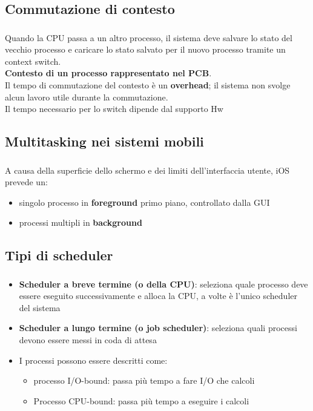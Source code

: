 \documentclass{beamer}
\newenvironment{mainframe}{
	\begin{frame}
		\frametitle{\insertsubsection}
		\framesubtitle{\insertsection}
	}{
	\end{frame}
}
\begin{document}
\subsection{Commutazione di contesto}
\begin{mainframe}
	Quando la CPU passa a un altro processo, il sistema deve salvare lo stato del vecchio processo e caricare lo stato salvato per il nuovo processo tramite un context switch.\\
	\textbf{Contesto di un processo rappresentato nel PCB}.\\
	Il tempo di commutazione del contesto è un \textbf{overhead}; il sistema non svolge alcun lavoro utile durante la commutazione.\\
	Il tempo necessario per lo switch dipende dal supporto Hw
\end{mainframe}
\subsection{Multitasking nei sistemi mobili}
\begin{mainframe}
	A causa della superficie dello schermo e dei limiti dell'interfaccia utente, iOS prevede un:
	\begin{itemize}
		\item singolo processo in \textbf{foreground} primo piano, controllato dalla GUI
		\item processi multipli in \textbf{background}
	\end{itemize}
\end{mainframe}
\subsection{Tipi di scheduler}
\begin{mainframe}
	\begin{itemize}
		\item \textbf{Scheduler a breve termine (o della CPU)}: seleziona quale processo deve essere eseguito successivamente e alloca la CPU, a volte è l'unico scheduler del sistema
		\item \textbf{Scheduler a lungo termine (o job scheduler)}: seleziona quali processi devono essere messi in coda di attesa
		\item I processi possono essere descritti come:
		\begin{itemize}
			\item processo I/O-bound: passa più tempo a fare I/O che calcoli
			\item Processo CPU-bound: passa più tempo a eseguire i calcoli
		\end{itemize}
	\end{itemize}
\end{mainframe}
\end{document}
